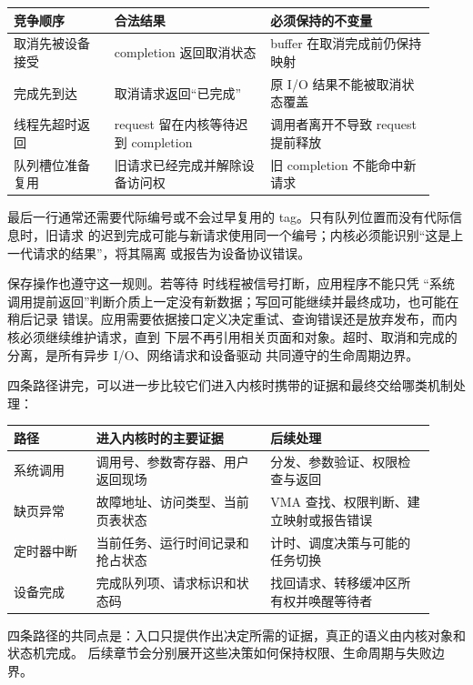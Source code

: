 \begin{longtable}{|L{0.22\linewidth}|L{0.34\linewidth}|L{0.36\linewidth}|}
\toprule
竞争顺序 & 合法结果 & 必须保持的不变量 \\
\midrule
取消先被设备接受 & completion 返回取消状态 & buffer 在取消完成前仍保持映射 \\\tablerowrule
完成先到达 & 取消请求返回“已完成” & 原 I/O 结果不能被取消状态覆盖 \\\tablerowrule
线程先超时返回 & request 留在内核等待迟到 completion & 调用者离开不导致 request 提前释放 \\\tablerowrule
队列槽位准备复用 & 旧请求已经完成并解除设备访问权 & 旧 completion 不能命中新请求 \\
\bottomrule
\end{longtable}

最后一行通常还需要代际编号或不会过早复用的 tag。只有队列位置而没有代际信息时，旧请求
的迟到完成可能与新请求使用同一个编号；内核必须能识别“这是上一代请求的结果”，将其隔离
或报告为设备协议错误。

保存操作也遵守这一规则。若等待  时线程被信号打断，应用程序不能只凭
“系统调用提前返回”判断介质上一定没有新数据；写回可能继续并最终成功，也可能在稍后记录
错误。应用需要依据接口定义决定重试、查询错误还是放弃发布，而内核必须继续维护请求，直到
下层不再引用相关页面和对象。超时、取消和完成的分离，是所有异步 I/O、网络请求和设备驱动
共同遵守的生命周期边界。

四条路径讲完，可以进一步比较它们进入内核时携带的证据和最终交给哪类机制处理：

\begin{longtable}{|L{0.18\linewidth}|L{0.38\linewidth}|L{0.36\linewidth}|}
\toprule
路径 & 进入内核时的主要证据 & 后续处理 \\
\midrule
系统调用 & 调用号、参数寄存器、用户返回现场 & 分发、参数验证、权限检查与返回 \\\tablerowrule
缺页异常 & 故障地址、访问类型、当前页表状态 & VMA 查找、权限判断、建立映射或报告错误 \\\tablerowrule
定时器中断 & 当前任务、运行时间记录和抢占状态 & 计时、调度决策与可能的任务切换 \\\tablerowrule
设备完成 & 完成队列项、请求标识和状态码 & 找回请求、转移缓冲区所有权并唤醒等待者 \\
\bottomrule
\end{longtable}

四条路径的共同点是：入口只提供作出决定所需的证据，真正的语义由内核对象和状态机完成。
后续章节会分别展开这些决策如何保持权限、生命周期与失败边界。

